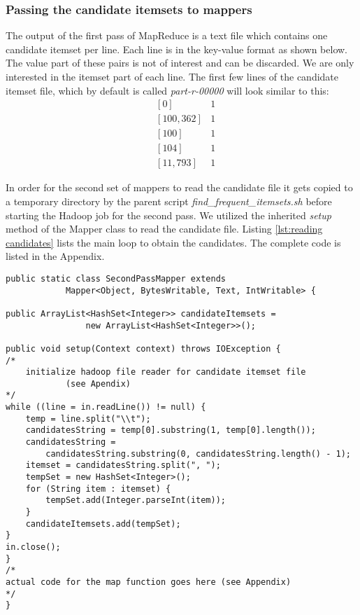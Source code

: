 \subsubsection{Passing the candidate itemsets to mappers}\label{passing candidates}
The output of the first pass of MapReduce is a text file which contains one candidate itemset per line. Each line is in the key-value format as shown below. The value part of these pairs is not of interest and can be discarded. We are only interested in the itemset part of each line. The first few lines of the candidate itemset file, which by default is called \textit{part-r-00000} will look similar to this:
\begin{align*}
&[0]&1
\\ &[100, 362]&1
\\ &[100]	&1
\\ &[104]	&1
\\ &[11, 793]	&1
\end{align*}

In order for the second set of mappers to read the candidate file it gets copied to a temporary directory by the parent script \textit{find\_frequent\_itemsets.sh} before starting the Hadoop job for the second pass. We utilized the inherited \textit{setup} method of the Mapper class to read the candidate file. Listing \ref{lst:reading candidates} lists the main loop to obtain the candidates. The complete code is listed in the Appendix.

\begin{lstlisting}[caption={reading the candidate itemset file},captionpos=b,label={lst:reading candidates}]
public static class SecondPassMapper extends
			Mapper<Object, BytesWritable, Text, IntWritable> {
			
public ArrayList<HashSet<Integer>> candidateItemsets = 
				new ArrayList<HashSet<Integer>>();
				
public void setup(Context context) throws IOException {
/*
	initialize hadoop file reader for candidate itemset file
			(see Apendix)
*/
while ((line = in.readLine()) != null) {
	temp = line.split("\\t");
	candidatesString = temp[0].substring(1, temp[0].length());
	candidatesString = 
		candidatesString.substring(0, candidatesString.length() - 1);
	itemset = candidatesString.split(", ");
	tempSet = new HashSet<Integer>();
	for (String item : itemset) {
		tempSet.add(Integer.parseInt(item));
	}
	candidateItemsets.add(tempSet);
}
in.close();
}
/*
actual code for the map function goes here (see Appendix)
*/
}
\end{lstlisting}


